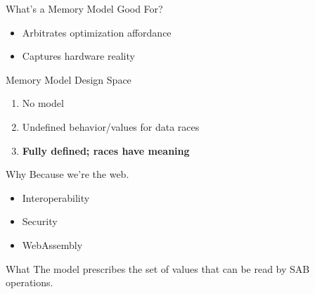 \documentclass[notes]{beamer}
\begin{document}
\begin{frame}{What's a Memory Model Good For?}
  \begin{itemize}
  \item Arbitrates optimization affordance
  \item Captures hardware reality
  \end{itemize}

\end{frame}

\begin{frame}{Memory Model Design Space}
  \begin{enumerate}
  \item No model
  \item Undefined behavior/values for data races
  \item \textbf{Fully defined; races have meaning}
  \end{enumerate}
\end{frame}

\begin{frame}{Why}
  Because we're the web.

  \begin{itemize}
  \item Interoperability
  \item Security
    \pause
  \item WebAssembly
  \end{itemize}

\end{frame}

\begin{frame}{What}
  The model prescribes the set of values that can be read by SAB operations.

\end{frame}
\end{document}
